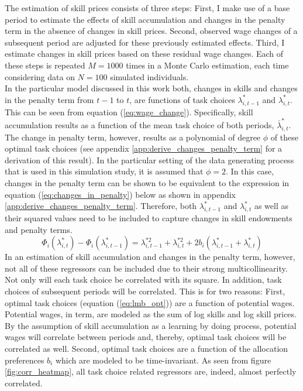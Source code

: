 \documentclass[../main.tex]{subfiles}
\begin{document}
The estimation of skill prices consists of three steps: First, I make use of a base period to estimate the effects of skill accumulation and changes in the penalty term in the absence of changes in skill prices. Second, observed wage changes of a subsequent period are adjusted for these previously estimated effects. Third, I estimate changes in skill prices based on these residual wage changes. Each of these steps is repeated $M=1000$ times in a Monte Carlo estimation, each time considering data on $N=100$ simulated individuals.
\\
In the particular model discussed in this work both, changes in skills and changes in the penalty term from $t-1$ to $t$, are functions of task choices $\lambda_{i,t-1}^*$ and $\lambda_{i,t}^*$. This can be seen from equation (\ref{eq:wage_change}). Specifically, skill accumulation results as a function of the mean task choice of both periods, $\bar{\lambda}_{i,t}^*$. The change in penalty term, however, results as a polynomial of degree $\phi$ of these optimal task choices (see appendix \ref{app:derive_changes_penalty_term} for a derivation of this result). In the particular setting of the data generating process that is used in this simulation study, it is assumed that $\phi = 2$. In this case, changes in the penalty term can be shown to be equivalent to the expression in equation (\ref{eq:changes_in_penalty}) below as shown in appendix \ref{app:derive_changes_penalty_term}. Therefore, both $\lambda_{i,t-1}^*$ and $\lambda_{i,t}^*$ as well as their squared values need to be included to capture changes in skill endowments and penalty terms.
\begin{equation}\label{eq:changes_in_penalty}
	\Phi_{i}(\lambda_{i,t}^*) - \Phi_{i}(\lambda_{i,t-1}^*) = \lambda_{i,t-1}^{*2} + \lambda_{i,t}^{*2} + 2b_i(\lambda_{i,t-1}^* + \lambda_{i,t}^*) 
\end{equation}
In an estimation of skill accumulation and changes in the penalty term, however, not all of these regressors can be included due to their strong multicollinearity. Not only will each task choice be correlated with its square. In addition, task choices of subsequent periods will be correlated. This is for two reasons: First, optimal task choices (equation (\ref{eq:lmb_opt})) are a function of potential wages. Potential wages, in term, are modeled as the sum of log skills and log skill prices. By the assumption of skill accumulation as a learning by doing process, potential wages will correlate between periods and, thereby, optimal task choices will be correlated as well. Second, optimal task choices are a function of the allocation preferences $b_i$ which are modeled to be time-invariant. As seen from figure \ref{fig:corr_heatmap}, all task choice related regressors are, indeed, almost perfectly correlated.
\end{document}
